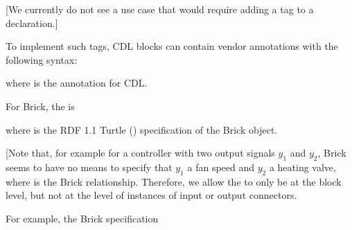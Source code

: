 \documentclass[letterpaper,10pt, openany,english]{sphinxmanual}
\begin{document}
{[}We currently do not see a use case that would require
adding a tag to a  declaration.{]}

To implement such tags, CDL blocks can contain
vendor annotations with the following syntax:

\begin{sphinxVerbatim}[commandchars=\\\{\}]
 
    \PYG{p}{[} \PYG{p}{]}
       \PYG{p}{[}  \PYG{p}{]}  \PYG{p}{[} \PYG{p}{]} 
\end{sphinxVerbatim}

where  is the annotation for CDL.

For Brick, the  is

\begin{sphinxVerbatim}[commandchars=\\\{\}]
      
\end{sphinxVerbatim}

where  is the RDF 1.1 Turtle
() specification of the Brick object.

{[}Note that, for example
for a controller with two output signals \(y_1\) and \(y_2\),
Brick seems to have no means to specify
that \(y_1\)  a fan speed and \(y_2\) 
a heating valve, where  is the Brick relationship.
Therefore, we allow the  to only be at the
block level, but not at the level of instances of input or output
connectors.

For example, the Brick specification
\end{document}
